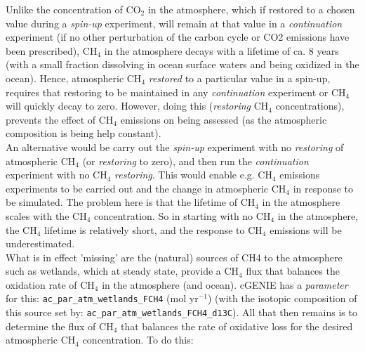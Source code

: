 \documentclass[11pt,fleqn]{book} %
\begin{document}
Unlike the concentration of CO\(_{2}\) in the atmosphere, which if restored to a chosen value during a \textit{spin-up} experiment, will remain at that value in a \textit{continuation} experiment (if no other perturbation of the carbon cycle or CO2 emissions have been prescribed), CH\(_{4}\) in the atmosphere decays with a lifetime of ca. 8 years (with a small fraction dissolving in ocean surface waters and being oxidized in the ocean). Hence, atmospheric CH\(_{4}\) \textit{restored} to a particular value in a spin-up, requires that restoring to be maintained in any \textit{continuation} experiment or CH\(_{4}\) will quickly decay to zero. However, doing this (\textit{restoring} CH\(_{4}\) concentrations), prevents the effect of CH\(_{4}\) emissions on being assessed (as the atmospheric composition is being help constant).\\
An alternative would be carry out the \textit{spin-up} experiment with no \textit{restoring} of atmospheric CH\(_{4}\) (or \textit{restoring} to zero), and then run the \textit{continuation} experiment with no CH\(_{4}\) \textit{restoring}. This would enable e.g. CH\(_{4}\) emissions experiments to be carried out and the change in atmospheric CH\(_{4}\) in response to be simulated. The problem here is that the lifetime of  CH\(_{4}\) in the atmosphere scales with the CH\(_{4}\) concentration. So in starting with no CH\(_{4}\) in the atmosphere, the CH\(_{4}\) lifetime is relatively short, and the response to CH\(_{4}\) emissions will be underestimated.\\
What is in effect 'missing' are the (natural) sources of CH4 to the atmosphere such as wetlands, which at steady state, provide a CH\(_{4}\) flux that balances the oxidation rate of CH\(_{4}\) in the atmosphere (and ocean). cGENIE has a \textit{parameter} for this: \texttt{ac\_par\_atm\_wetlands\_FCH4} (mol yr\(^{-1}\)) (with the isotopic composition of this source set by: \texttt{ac\_par\_atm\_wetlands\_FCH4\_d13C}). All that then remains is to determine the flux of CH\(_{4}\) that balances the rate of oxidative loss for the desired atmospheric CH\(_{4}\) concentration. To do this:
\end{document}
